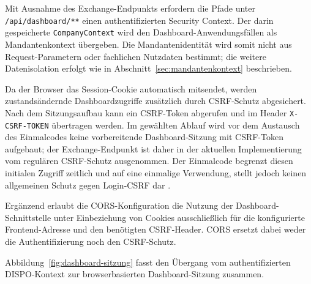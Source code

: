 \documentclass[
  12pt,
  a4paper,
  oneside
]{article}
\begin{document}
Mit Ausnahme des Exchange-Endpunkts erfordern die Pfade unter
\texttt{/api/dashboard/**} einen authentifizierten Security Context. Der darin
gespeicherte \texttt{CompanyContext} wird den Dashboard-Anwendungsfällen als
Mandantenkontext übergeben. Die Mandantenidentität wird somit nicht aus
Request-Parametern oder fachlichen Nutzdaten bestimmt; die weitere
Datenisolation erfolgt wie in Abschnitt~\ref{sec:mandantenkontext} beschrieben.

Da der Browser das Session-Cookie automatisch mitsendet, werden
zustandsändernde Dashboardzugriffe zusätzlich durch CSRF-Schutz abgesichert.
Nach dem Sitzungsaufbau kann ein CSRF-Token abgerufen und im Header
\texttt{X-CSRF-TOKEN} übertragen werden. Im gewählten Ablauf wird vor dem
Austausch des Einmalcodes keine vorbereitende Dashboard-Sitzung mit CSRF-Token
aufgebaut; der Exchange-Endpunkt ist daher in der aktuellen Implementierung
vom regulären CSRF-Schutz ausgenommen. Der Einmalcode begrenzt diesen initialen
Zugriff zeitlich und auf eine einmalige Verwendung, stellt jedoch keinen
allgemeinen Schutz gegen Login-CSRF dar
\parencite{owaspCsrfPrevention}.

Ergänzend erlaubt die CORS-Konfiguration die Nutzung der
Dashboard-Schnittstelle unter Einbeziehung von Cookies ausschließlich für die
konfigurierte Frontend-Adresse und den benötigten CSRF-Header. CORS ersetzt
dabei weder die Authentifizierung noch den CSRF-Schutz.

Abbildung~\ref{fig:dashboard-sitzung} fasst den Übergang vom authentifizierten
DISPO-Kontext zur browserbasierten Dashboard-Sitzung zusammen.
\end{document}
